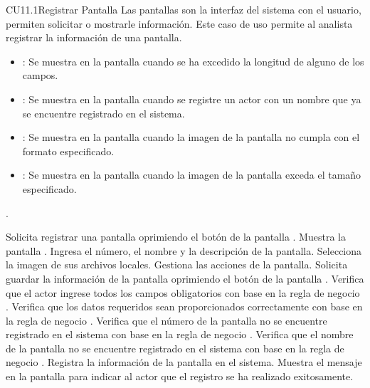 \begin{UseCase}{CU11.1}{Registrar Pantalla}{
		Las pantallas son la interfaz del sistema con el usuario, permiten solicitar o mostrarle información. Este caso de uso permite al analista registrar la información de una pantalla.
	}
{\begin{itemize}
		\item {}: Se muestra en la pantalla  cuando se ha excedido la longitud de alguno de los campos.
		\item {}: Se muestra en la pantalla  cuando se registre un actor con un nombre que ya se encuentre registrado en el sistema.
		\item {}: Se muestra en la pantalla  cuando la imagen de la pantalla no cumpla con el formato especificado.
		\item {}: Se muestra en la pantalla  cuando la imagen de la pantalla exceda el tamaño especificado.
		\end{itemize}.
		}
	\end{UseCase}
	\begin{UCtrayectoria}
		\UCpaso[\UCactor] Solicita registrar una pantalla oprimiendo el botón  de la pantalla .
		\UCpaso[\UCsist] Muestra la pantalla .
		\UCpaso[\UCactor] Ingresa el número, el nombre y la descripción de la pantalla. \label{CU11.1-P3}
		\UCpaso[\UCactor] Selecciona la imagen de sus archivos locales. \label{CU11.1-P4}
		\UCpaso[\UCactor] Gestiona las acciones de la pantalla. \label{CU11.1-P5}
		\UCpaso[\UCactor] Solicita guardar la información de la pantalla oprimiendo el botón  de la pantalla . 
		\UCpaso[\UCsist] Verifica que el actor ingrese todos los campos obligatorios con base en la regla de negocio . 
		\UCpaso[\UCsist] Verifica que los datos requeridos sean proporcionados correctamente con base en la regla de negocio .     
		\UCpaso[\UCsist] Verifica que el número de la pantalla no se encuentre registrado en el sistema con base en la regla de negocio . 
		\UCpaso[\UCsist] Verifica que el nombre de la pantalla no se encuentre registrado en el sistema con base en la regla de negocio .  
		\UCpaso[\UCsist] Registra la información de la pantalla en el sistema.
		\UCpaso[\UCsist] Muestra el mensaje  en la pantalla  para indicar al actor que el registro se ha realizado exitosamente.
	\end{UCtrayectoria}		

